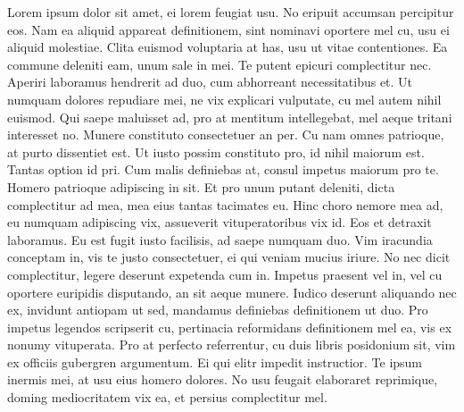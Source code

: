 Lorem ipsum dolor sit amet, ei lorem feugiat usu. No eripuit accumsan percipitur eos. Nam ea aliquid appareat definitionem, sint nominavi oportere mel cu, usu ei aliquid molestiae. Clita euismod voluptaria at has, usu ut vitae contentiones. Ea commune deleniti eam, unum sale in mei. Te putent epicuri complectitur nec. Aperiri laboramus hendrerit ad duo, cum abhorreant necessitatibus et. Ut numquam dolores repudiare mei, ne vix explicari vulputate, cu mel autem nihil euismod. Qui saepe maluisset ad, pro at mentitum intellegebat, mel aeque tritani interesset no. Munere constituto consectetuer an per. Cu nam omnes patrioque, at purto dissentiet est. Ut iusto possim constituto pro, id nihil maiorum est. Tantas option id pri. Cum malis definiebas at, consul impetus maiorum pro te. Homero patrioque adipiscing in sit. Et pro unum putant deleniti, dicta complectitur ad mea, mea eius tantas tacimates eu. Hinc choro nemore mea ad, eu numquam adipiscing vix, assueverit vituperatoribus vix id. Eos et detraxit laboramus. Eu est fugit iusto facilisis, ad saepe numquam duo. Vim iracundia conceptam in, vis te justo consectetuer, ei qui veniam mucius iriure. No nec dicit complectitur, legere deserunt expetenda cum in. Impetus praesent vel in, vel cu oportere euripidis disputando, an sit aeque munere. Iudico deserunt aliquando nec ex, invidunt antiopam ut sed, mandamus definiebas definitionem ut duo. Pro impetus legendos scripserit cu, pertinacia reformidans definitionem mel ea, vis ex nonumy vituperata. Pro at perfecto referrentur, cu duis libris posidonium sit, vim ex officiis gubergren argumentum. Ei qui elitr impedit instructior. Te ipsum inermis mei, at usu eius homero dolores. No usu feugait elaboraret reprimique, doming mediocritatem vix ea, et persius complectitur mel.

